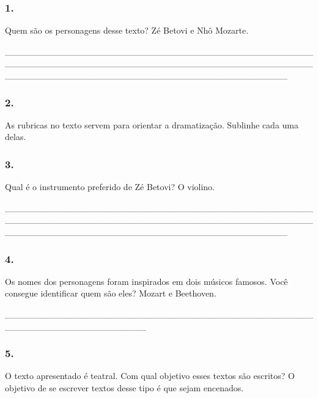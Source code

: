 \subsubsection{1. }\label{section-16}

Quem são os personagens desse texto? Zé Betovi e Nhô Mozarte.

\_\_\_\_\_\_\_\_\_\_\_\_\_\_\_\_\_\_\_\_\_\_\_\_\_\_\_\_\_\_\_\_\_\_\_\_\_\_\_\_\_\_\_\_\_\_\_\_\_\_\_\_\_\_\_\_\_\_\_\_\_\_\_\_\_\_\_\_\_\_\_\_\_\_\_\_\_\_\_\_\_\_\_\_\_\_\_\_\_\_\_\_\_\_\_\_\_\_\_\_\_\_\_\_\_\_\_\_\_\_\_\_\_\_\_\_\_\_\_\_\_\_\_\_\_\_\_\_\_\_\_\_\_\_\_\_\_\_\_\_

\subsubsection{2. }\label{section-17}

As rubricas no texto servem para orientar a dramatização. Sublinhe cada
uma delas.

\subsubsection{3. }\label{section-18}

Qual é o instrumento preferido de Zé Betovi? O violino.

\protect\hypertarget{_Hlk127362551}{}{}\_\_\_\_\_\_\_\_\_\_\_\_\_\_\_\_\_\_\_\_\_\_\_\_\_\_\_\_\_\_\_\_\_\_\_\_\_\_\_\_\_\_\_\_\_\_\_\_\_\_\_\_\_\_\_\_\_\_\_\_\_\_\_\_\_\_\_\_\_\_\_\_\_\_\_\_\_\_\_\_\_\_\_\_\_\_\_\_\_\_\_\_\_\_\_\_\_\_\_\_\_\_\_\_\_\_\_\_\_\_\_\_\_\_\_\_\_\_\_\_\_\_\_\_\_\_\_\_\_\_\_\_\_\_\_\_\_\_\_\_

\subsubsection{4. }\label{section-19}

Os nomes dos personagens foram inspirados em dois músicos famosos. Você
consegue identificar quem são eles? Mozart e Beethoven.

\_\_\_\_\_\_\_\_\_\_\_\_\_\_\_\_\_\_\_\_\_\_\_\_\_\_\_\_\_\_\_\_\_\_\_\_\_\_\_\_\_\_\_\_\_\_\_\_\_\_\_\_\_\_\_\_\_\_\_\_\_\_\_\_\_\_\_\_\_\_

\subsubsection{5. }\label{section-20}

O texto apresentado é teatral. Com qual objetivo esses textos são
escritos? O objetivo de se escrever textos desse tipo é que sejam
encenados.


